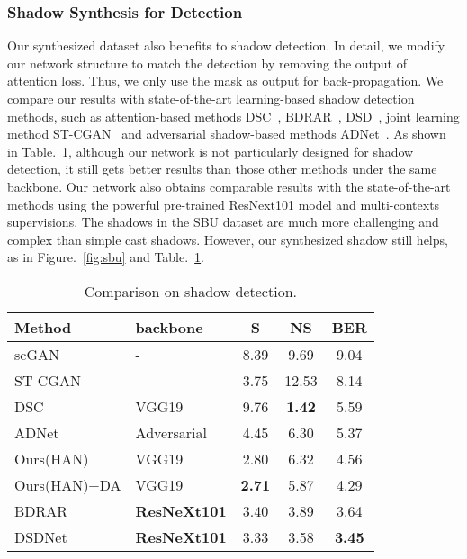 \documentclass[letterpaper]{article} \usepackage{aaai20}  \usepackage{times}  \usepackage{helvet} \usepackage{courier}  \usepackage[hyphens]{url}  \urlstyle{rm} \def\UrlFont{\rm}  \usepackage{graphicx}  \frenchspacing  \setlength{\pdfpagewidth}{8.5in}  \setlength{\pdfpageheight}{11in}  \usepackage{amssymb}
\begin{document}
 





\subsubsection{Shadow Synthesis for Detection} Our synthesized dataset also benefits to shadow detection. In detail, we modify our network structure to match the detection by removing the output of attention loss. Thus, we only use the mask as output for back-propagation. We compare our results with state-of-the-art learning-based shadow detection methods, such as attention-based methods DSC~\cite{Hu:2018wd}, BDRAR~\cite{zhu2018bidirectional}, DSD~\cite{zheng2019distraction}, joint learning method ST-CGAN~\cite{wang2018stacked} and adversarial shadow-based methods ADNet~\cite{Le:2018vu}. As shown in Table.~\ref{table:detection}, although our network is not particularly designed for shadow detection, it still gets better results than those other methods under the same backbone. Our network also obtains comparable results with the state-of-the-art methods using the powerful pre-trained ResNext101 model and multi-contexts supervisions. The shadows in the SBU dataset are much more challenging and complex than simple cast shadows. However, our synthesized shadow still helps, as in Figure.~\ref{fig:sbu} and Table.~\ref{table:detection}. 

\begin{table}[t]
\caption{Comparison on shadow detection.}
\label{table:detection}
\begin{center}
\begin{tabular}{|l|l|c|c|c|}
\hline
Method & backbone & S & NS & BER  \\
\hline
\hline
scGAN & - &  8.39 & 9.69 & 9.04 \\
ST-CGAN & - & 3.75 & 12.53 & 8.14   \\
DSC  &   VGG19    & 9.76  & \textbf{1.42} & 5.59   \\
ADNet  & Adversarial &  4.45  &  6.30  & 5.37  \\
Ours(HAN)   &  VGG19 & 2.80 & 6.32 & 4.56 \\ 
Ours(HAN)+DA   &  VGG19 & \textbf{2.71} & 5.87 & 4.29 \\ 
\hline
BDRAR  & \textbf{ResNeXt101} &  3.40 &  3.89  & 3.64 \\
DSDNet  & \textbf{ResNeXt101} &  3.33  & 3.58    & \textbf{3.45} \\
\hline
\end{tabular}
\end{center}
\end{table}
\end{document}
